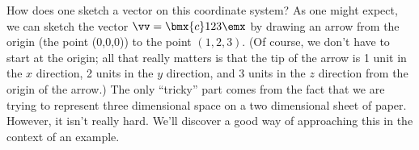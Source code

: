 How does one sketch a vector on this coordinate system? As one might expect, we can sketch the vector $\vv = \bmx{c} 1\\2\\3\emx$ by drawing an arrow from the origin (the point (0,0,0)) to the point $(1,2,3)$. (Of course, we don't have to start at the origin; all that really matters is that the tip of the arrow is 1 unit in the $x$ direction, 2 units in the $y$ direction, and 3 units in the $z$ direction from the origin of the arrow.) The only ``tricky'' part comes from the fact that we are trying to represent three dimensional space on a two dimensional sheet of paper. However, it isn't really hard. We'll discover a good way of approaching this in the context of an example.

\medskip

